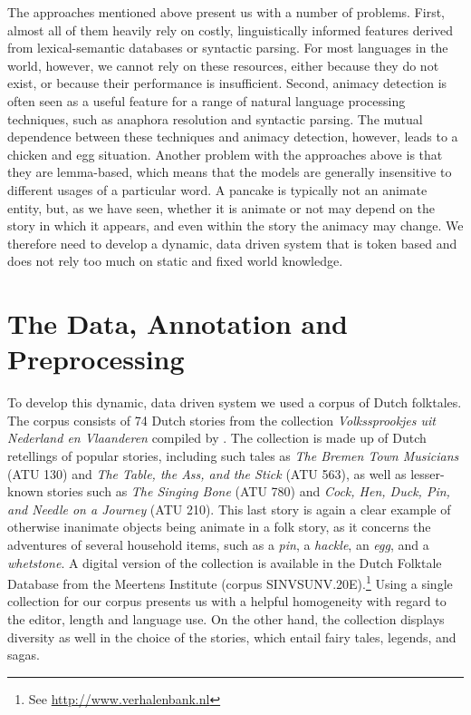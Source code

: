 \documentclass[a4paper,UKenglish]{oasics}
\begin{document}
The approaches mentioned above present us with a number of
problems. First, almost all of them heavily rely on costly,
linguistically informed features derived from lexical-semantic
databases or syntactic parsing. For most languages in the world,
however, we cannot rely on these resources, either because they do not
exist, or because their performance is insufficient.  Second, animacy
detection is often seen as a useful feature for a range of natural
language processing techniques, such as anaphora resolution and
syntactic parsing. The mutual dependence between these techniques and
animacy detection, however, leads to a chicken and egg
situation. Another problem with the approaches above is that they are
lemma-based, which means that the models are generally insensitive to
different usages of a particular word. A pancake is typically not an
animate entity, but, as we have seen, whether it is animate or not may
depend on the story in which it appears, and even within the story the
animacy may change. We therefore need to develop a dynamic, data
driven system that is token based and does not rely too much on static
and fixed world knowledge.

\section{The Data, Annotation and Preprocessing}\label{sec:data}

To develop this dynamic, data driven system we used a corpus of Dutch
folktales. The corpus consists of 74 Dutch stories from the collection
\textit{Volkssprookjes uit Nederland en Vlaanderen} compiled by
\cite{sinninghe:78}. The collection is made up of Dutch retellings of
popular stories, including such tales as \textit{The Bremen Town
  Musicians} (ATU 130) and \textit{The Table, the Ass, and the Stick }
(ATU 563), as well as lesser-known stories such as \textit{The Singing
  Bone} (ATU 780) and \textit{Cock, Hen, Duck, Pin, and Needle on a
  Journey} (ATU 210). This last story is again a clear example of
otherwise inanimate objects being animate in a folk story, as it
concerns the adventures of several household items, such as a
\textit{pin}, a \textit{hackle}, an \textit{egg}, and a
\textit{whetstone}. A digital version of the collection is available
in the Dutch Folktale Database from the Meertens Institute (corpus
SINVSUNV.20E).\footnote{See \url{http://www.verhalenbank.nl}} Using a
single collection for our corpus presents us with a helpful
homogeneity with regard to the editor, length and language use. On the
other hand, the collection displays diversity as well in the choice of
the stories, which entail fairy tales, legends, and sagas.
\end{document}
